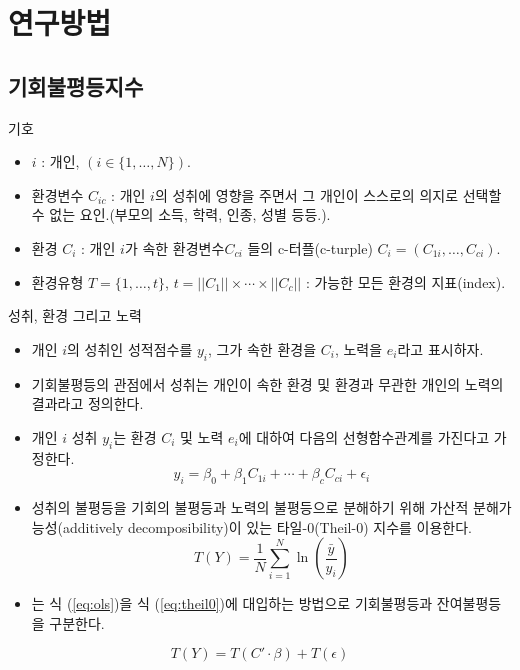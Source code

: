\documentclass[handout, 10pt]{beamer}
\begin{document}
\section{연구방법}
\subsection{기회불평등지수}
\begin{frame}{기호}
    \begin{itemize}
        \item  $i$ : 개인, $(i \in \{1,\ldots,N \} )$.
        \item 환경변수 $C_{ic}$ : 개인 $i$의 성취에 영향을 주면서 그 개인이 스스로의 의지로 선택할 수 없는 요인.(부모의 소득, 학력, 인종, 성별 등등.).
        \item 환경 $C_i$ : 개인 $i$가 속한 환경변수$C_{ci}$ 들의 c-터플(c-turple) $C_i = (C_{1i}, \ldots , C_{ci})$. 
        \item 환경유형 $T= \{1, \ldots , t \}$, $t= ||C_1|| \times \cdots \times ||C_c||$ : 가능한 모든 환경의 지표(index).
    \end{itemize}
\end{frame}

\begin{frame}{성취, 환경 그리고 노력}
    \begin{itemize}
        \item 개인 $i$의 성취인 성적점수를 $y_i$, 그가 속한 환경을 $C_i$, 노력을 $e_i$라고 표시하자.
        \item 기회불평등의 관점에서 성취는 개인이 속한 환경 및 환경과 무관한 개인의 노력의 결과라고 정의한다.
        \item 개인 $i$ 성취 $y_i$는 환경 $C_i$ 및 노력 $e_i$에 대하여 다음의 선형함수관계를 가진다고 가정한다.
        \begin{equation}
            \label{eq:ols}
             y_{i} =\beta _0 +  \beta _1 C_{1i} + \cdots + \beta _c C_{ci} + \epsilon _i
        \end{equation}
    \end{itemize}
\end{frame}

\begin{frame}{\cite{fng11}}
    \begin{itemize}
        \item 성취의 불평등을 기회의 불평등과 노력의 불평등으로 분해하기 위해 가산적 분해가능성(additively decomposibility)이 있는 타일-0(Theil-0) 지수를 이용한다.
        \begin{equation}
            \label{eq:theil0}
            T(Y)=\frac{1}{N} \sum_{i=1}^{N} \ln \left(\frac{\bar{y}}{y_{i}}\right)
        \end{equation} 
        \item \cite{fng11}는 식 (\ref{eq:ols})을 식 (\ref{eq:theil0})에 대입하는 방법으로 기회불평등과 잔여불평등을 구분한다.
    \end{itemize}
    \begin{equation}
        \label{eq:theil0-decompose}
        T(Y)=T(C ' \cdot \beta) + T(\epsilon)
    \end{equation}
\end{frame}
\end{document}
